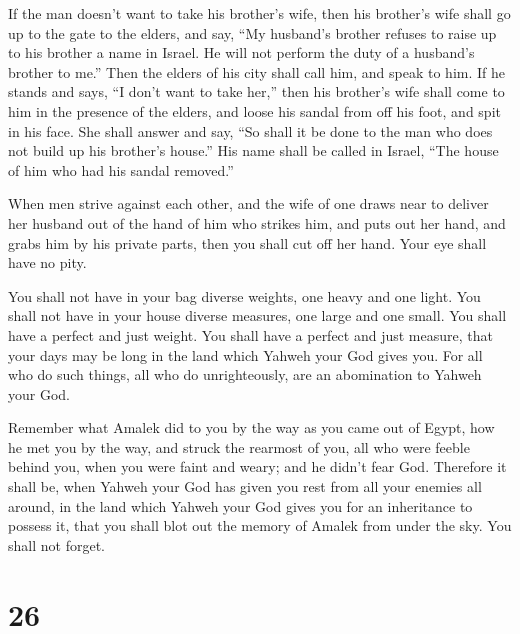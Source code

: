  If the man doesn't want to take his brother's wife, then
his brother's wife shall go up to the gate to the elders, and say, ``My
husband's brother refuses to raise up to his brother a name in Israel.
He will not perform the duty of a husband's brother to me.''
 Then the elders of his city shall call him, and speak to
him. If he stands and says, ``I don't want to take her,'' 
then his brother's wife shall come to him in the presence of the elders,
and loose his sandal from off his foot, and spit in his face. She shall
answer and say, ``So shall it be done to the man who does not build up
his brother's house.''  His name shall be called in Israel,
``The house of him who had his sandal removed.''

 When men strive against each other, and the wife of one
draws near to deliver her husband out of the hand of him who strikes
him, and puts out her hand, and grabs him by his private parts,
 then you shall cut off her hand. Your eye shall have no
pity.

 You shall not have in your bag diverse weights, one heavy
and one light.  You shall not have in your house diverse
measures, one large and one small.  You shall have a
perfect and just weight. You shall have a perfect and just measure, that
your days may be long in the land which Yahweh your God gives you.
 For all who do such things, all who do unrighteously, are
an abomination to Yahweh your God.

 Remember what Amalek did to you by the way as you came out
of Egypt,  how he met you by the way, and struck the
rearmost of you, all who were feeble behind you, when you were faint and
weary; and he didn't fear God.  Therefore it shall be, when
Yahweh your God has given you rest from all your enemies all around, in
the land which Yahweh your God gives you for an inheritance to possess
it, that you shall blot out the memory of Amalek from under the sky. You
shall not forget.

\hypertarget{section-25}{%
\section{26}\label{section-25}}

